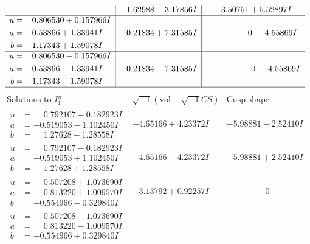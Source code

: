 \documentclass[1p]{elsarticle_modified}
\theoremstyle{definition}
\newcommand{\I}{\sqrt{-1}}
\begin{document}
$$\begin{array}{c|c|c}
 & \phantom{-}1.62988 - 3.17856 I & -3.50751 + 5.52897 I \\ \hline\begin{aligned}
u &= \phantom{-}0.806530 + 0.157966 I \\
a &= \phantom{-}0.53866 + 1.33941 I \\
b &= -1.17343 + 1.59078 I\end{aligned}
 & \phantom{-}0.21834 + 7.31585 I & \phantom{-0.000000 } 0. - 4.55869 I \\ \hline\begin{aligned}
u &= \phantom{-}0.806530 - 0.157966 I \\
a &= \phantom{-}0.53866 - 1.33941 I \\
b &= -1.17343 - 1.59078 I\end{aligned}
 & \phantom{-}0.21834 - 7.31585 I & \phantom{-0.000000 -}0. + 4.55869 I\\
 \hline 
 \end{array}$$\newpage$$\begin{array}{c|c|c}  
\text{Solutions to }I^u_{1}& \I (\text{vol} + \sqrt{-1}CS) & \text{Cusp shape}\\
 \hline 
\begin{aligned}
u &= \phantom{-}0.792107 + 0.182923 I \\
a &= -0.519053 - 1.102450 I \\
b &= \phantom{-}1.27628 - 1.28558 I\end{aligned}
 & -4.65166 + 4.23372 I & -5.98881 - 2.52410 I \\ \hline\begin{aligned}
u &= \phantom{-}0.792107 - 0.182923 I \\
a &= -0.519053 + 1.102450 I \\
b &= \phantom{-}1.27628 + 1.28558 I\end{aligned}
 & -4.65166 - 4.23372 I & -5.98881 + 2.52410 I \\ \hline\begin{aligned}
u &= \phantom{-}0.507208 + 1.073690 I \\
a &= \phantom{-}0.813220 + 1.009570 I \\
b &= -0.554966 - 0.329840 I\end{aligned}
 & -3.13792 + 0.92257 I & \phantom{-0.000000 } 0 \\ \hline\begin{aligned}
u &= \phantom{-}0.507208 - 1.073690 I \\
a &= \phantom{-}0.813220 - 1.009570 I \\
b &= -0.554966 + 0.329840 I\end{aligned}

\end{array}$$
\end{document}
